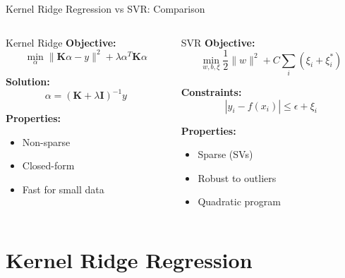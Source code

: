 \documentclass[8pt,aspectratio=1610]{beamer}
\begin{document}
\begin{frame}{Kernel Ridge Regression vs SVR: Comparison}
\begin{columns}[t]
\begin{column}{0.48\textwidth}
\begin{block}{Kernel Ridge}
\textbf{Objective:}
$$\min_\alpha \|\mathbf{K}\alpha - y\|^2 + \lambda \alpha^T \mathbf{K} \alpha$$

\textbf{Solution:}
$$\alpha = (\mathbf{K} + \lambda \mathbf{I})^{-1} y$$
\end{block}

\textbf{Properties:}
\begin{itemize}
\setlength{\itemsep}{0pt}
\item Non-sparse
\item Closed-form
\item Fast for small data
\end{itemize}
\end{column}

\begin{column}{0.48\textwidth}
\begin{block}{SVR}
\textbf{Objective:}
$$\min_{w,b,\xi} \frac{1}{2}\|w\|^2 + C\sum_i (\xi_i + \xi_i^*)$$

\textbf{Constraints:}
$$|y_i - f(x_i)| \leq \epsilon + \xi_i$$
\end{block}

\textbf{Properties:}
\begin{itemize}
\setlength{\itemsep}{0pt}
\item Sparse (SVs)
\item Robust to outliers
\item Quadratic program
\end{itemize}
\end{column}
\end{columns}
\end{frame}

\section{Kernel Ridge Regression}
\end{document}
